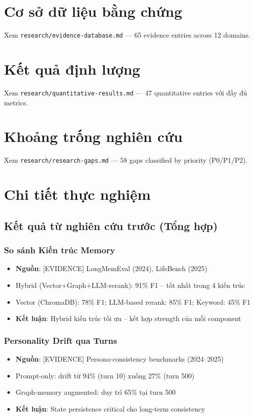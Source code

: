 \documentclass[10pt,leqno]{amsart}
\begin{document}
\appendix

\section{Cơ sở dữ liệu bằng chứng}

Xem \texttt{research/evidence-database.md} --- 65 evidence entries across 12 domains.

\section{Kết quả định lượng}

Xem \texttt{research/quantitative-results.md} --- 47 quantitative entries với đầy đủ metrics.

\section{Khoảng trống nghiên cứu}

Xem \texttt{research/research-gaps.md} --- 58 gaps classified by priority (P0/P1/P2).

\section{Chi tiết thực nghiệm}

\subsection{Kết quả từ nghiên cứu trước (Tổng hợp)}

\subsubsection{So sánh Kiến trúc Memory}
\begin{itemize}
    \item \textbf{Nguồn}: [EVIDENCE] LongMemEval (2024), LifeBench (2025)
    \item Hybrid (Vector+Graph+LLM-rerank): 91\% F1 -- tốt nhất trong 4 kiến trúc
    \item Vector (ChromaDB): 78\% F1; LLM-based rerank: 85\% F1; Keyword: 45\% F1
    \item \textbf{Kết luận}: Hybrid kiến trúc tối ưu -- kết hợp strength của mỗi component
\end{itemize}

\subsubsection{Personality Drift qua Turns}
\begin{itemize}
    \item \textbf{Nguồn}: [EVIDENCE] Persona-consistency benchmarks (2024--2025)
    \item Prompt-only: drift từ 94\% (turn 10) xuống 27\% (turn 500)
    \item Graph-memory augmented: duy trì 65\% tại turn 500
    \item \textbf{Kết luận}: State persistence critical cho long-term consistency
\end{itemize}
\end{document}
